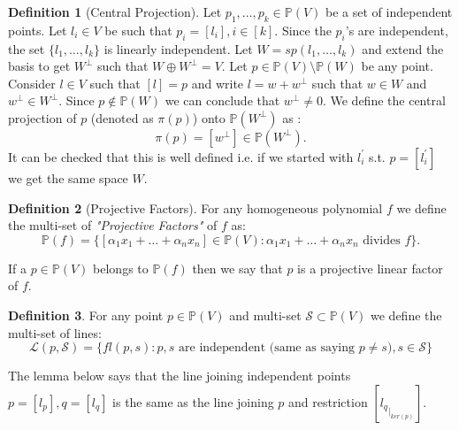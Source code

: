 \documentclass[12pt]{caltech_thesis}
\theoremstyle{plain}
\theoremstyle{definition}
\newtheorem{definition}{Definition}
\newcommand{\MS}{\mathcal{S}}
\newcommand{\ML}{\mathcal{L}}
\newcommand{\PP}{\mathbb{P}}
\begin{document}
\begin{definition}[Central Projection]\label{definition:centralprojection}
Let $p_1,\ldots,p_k\in \PP(V)$ be a set of independent points. Let $l_i\in V$ be such that $p_i = [l_i], i\in [k]$.
Since the $p_i$'s are independent, the set $\{l_1,\ldots,l_k\}$ is linearly independent. Let $W = sp(l_1,\ldots,l_k)$
and extend the basis to get $W^\perp$ such that $W\oplus W^\perp = V$. Let $p \in \PP(V) \setminus \PP(W)$ be any point. 
Consider $l \in V$
such that $[l] = p$ and write $l = w + w^\perp$ such that $w\in W$ and $w^\perp\in W^\perp$. Since $p\notin \PP(W)$ we can conclude that
$w^\perp\neq 0$.  We define the central projection of $p$ (denoted as $\pi(p)$) onto $\PP(W^\perp)$ as :
\[
 \pi(p) = [w^\perp] \in \PP(W^\perp).
\]
It can be checked that this is well defined i.e. if we started with $l_i^\prime$ s.t. $p = [l_i^\prime]$ 
we get the same space $W$.  

\end{definition}

\begin{definition}[Projective Factors]\label{definition:projectivefactors}
 For any homogeneous polynomial $f$ we define the multi-set of \emph{"Projective Factors"} of $f$ as:
\[
 \PP(f) = \{ [\alpha_1x_1+\ldots + \alpha_nx_n]\in \PP(V) : \alpha_1x_1+\ldots + \alpha_nx_n  \text{ divides }f  \}.
\]

If a $p\in \PP(V)$ belongs to $\PP(f)$ then we say that $p$ is a projective linear factor of $f$.
\end{definition}



\begin{definition}\label{definition:lines}
 For any point $p\in \PP(V)$ and multi-set $\MS \subset \PP(V)$ we define the multi-set of lines:
\[
 \ML(p, \MS) = \{ fl(p, s) : p,s \text{ are independent (same as saying  }p \neq s), s \in \MS\}
\]
\end{definition}


The lemma below says that the line joining independent points $p=[l_p],q=[l_q]$ is the same as the line joining
$p$ and restriction $[{l_q}_{|_{ker(p)}}]$. 
\end{document}
